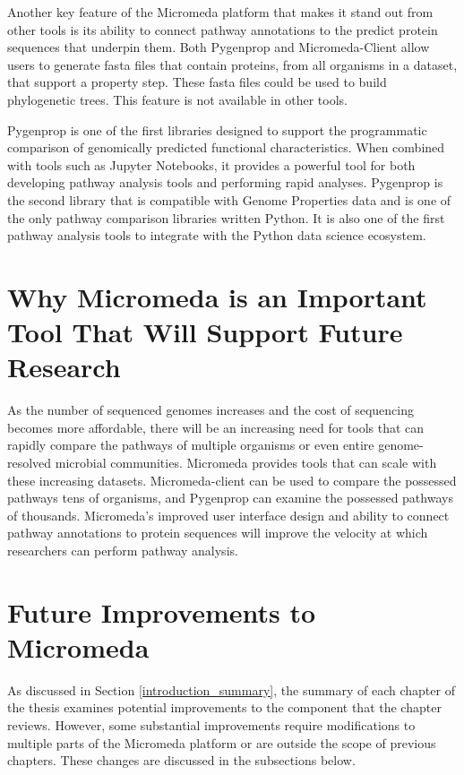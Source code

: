 Another key feature of the Micromeda platform that makes it stand out from other 
tools is its ability to connect pathway annotations to the predict protein 
sequences that underpin them. Both Pygenprop and Micromeda-Client allow users to 
generate \gls{fasta} files that contain proteins, from all organisms in a dataset, 
that support a property step. These \gls{fasta} files could be used to build 
phylogenetic trees. This feature is not available in other tools.

Pygenprop is one of the first libraries designed to support the programmatic 
comparison of genomically predicted functional characteristics. When combined 
with tools such as Jupyter Notebooks, it provides a powerful tool for both 
developing pathway analysis tools and performing rapid analyses. Pygenprop is 
the second library that is compatible with Genome Properties data and is one of 
the only pathway comparison libraries written Python. It is also one of the 
first pathway analysis tools to integrate with the Python data science 
ecosystem.

\section{Why Micromeda is an Important Tool That Will Support Future Research}

As the number of sequenced genomes increases and the cost of sequencing becomes 
more affordable, there will be an increasing need for tools that can rapidly 
compare the pathways of multiple organisms or even entire genome-resolved 
microbial communities. Micromeda provides tools that can scale with these 
increasing datasets. Micromeda-client can be used to compare the possessed 
pathways tens of organisms, and Pygenprop can examine the possessed pathways of 
thousands. Micromeda's improved user interface design and ability to connect 
pathway annotations to protein sequences will improve the velocity at which 
researchers can perform pathway analysis.

\section{Future Improvements to Micromeda}

As discussed in Section \ref{introduction_summary}, the summary of each chapter 
of the thesis examines potential improvements to the component that the chapter 
reviews. However, some substantial improvements require modifications to 
multiple parts of the Micromeda platform or are outside the scope of previous 
chapters. These changes are discussed in the subsections below.

